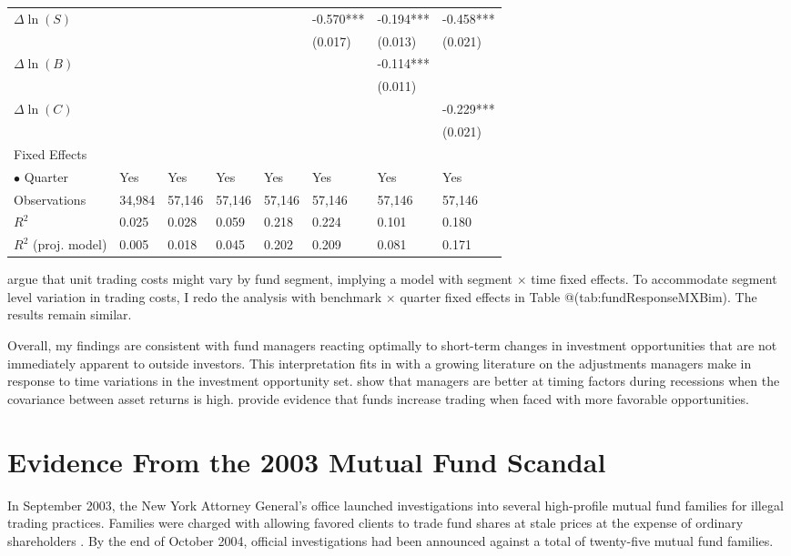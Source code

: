 \documentclass[openany]{book}
\theoremstyle{definition}
\theoremstyle{definition}
\theoremstyle{definition}
\theoremstyle{remark}
\begin{document}
\begin{table}[ht]
\begin{tabularx}{0.975\textwidth}{lYYYYYYY}
  $\Delta\ln(S)$ &  &  &  &  & -0.570*** & -0.194*** & -0.458*** \\ 
   &  &  &  &  & (0.017) & (0.013) & (0.021) \\ 
  $\Delta\ln(B)$ &  &  &  &  &  & -0.114*** &  \\ 
   &  &  &  &  &  & (0.011) &  \\ 
  $\Delta\ln(C)$ &  &  &  &  &  &  & -0.229*** \\ 
   &  &  &  &  &  &  & (0.021) \\ 
  Fixed Effects &  &  &  &  &  &  &  \\ 
  $\bullet$ Quarter & Yes & Yes & Yes & Yes & Yes & Yes & Yes \\ 
  Observations & 34,984 & 57,146 & 57,146 & 57,146 & 57,146 & 57,146 & 57,146 \\ 
  $R^2$ & 0.025 & 0.028 & 0.059 & 0.218 & 0.224 & 0.101 & 0.180 \\ 
  $R^2$ (proj. model) & 0.005 & 0.018 & 0.045 & 0.202 & 0.209 & 0.081 & 0.171 \\ 
   \bottomrule
\end{tabularx}
\endgroup
\end{table}

\citet{pst17L} argue that unit trading costs might vary by fund segment,
implying a model with segment \(\times\) time fixed effects. To
accommodate segment level variation in trading costs, I redo the
analysis with benchmark \(\times\) quarter fixed effects in Table
@(tab:fundResponseMXBim). The results remain similar.

Overall, my findings are consistent with fund managers reacting
optimally to short-term changes in investment opportunities that are not
immediately apparent to outside investors. This interpretation fits in
with a growing literature on the adjustments managers make in response
to time variations in the investment opportunity set. \citet{knv16} show
that managers are better at timing factors during recessions when the
covariance between asset returns is high. \citet{pst17} provide evidence
that funds increase trading when faced with more favorable
opportunities.

\chapter{Evidence From the 2003 Mutual Fund Scandal}\label{sec:scandal}

In September 2003, the New York Attorney General's office launched
investigations into several high-profile mutual fund families for
illegal trading practices. Families were charged with allowing favored
clients to trade fund shares at stale prices at the expense of ordinary
shareholders \citep{hw05, zitzewitz06}. By the end of October 2004,
official investigations had been announced against a total of
twenty-five mutual fund families.
\end{document}
